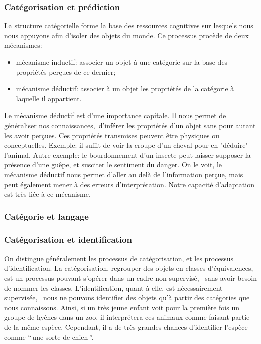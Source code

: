 \subsubsection{Catégorisation et prédiction}
\label{sec:ch3_categoPred}

La structure catégorielle forme la base des ressources cognitives sur lesquels nous nous appuyons afin d'isoler des objets du monde. Ce processus procède de deux mécanismes:

\begin{itemize} 
\item mécanisme inductif: associer un objet à une catégorie sur la base des propriétés perçues de ce dernier;
\item mécanisme déductif: associer à un objet les propriétés de la catégorie à laquelle il appartient.
\end{itemize}

Le mécanisme déductif est d'une importance capitale. Il nous permet de généraliser nos connaissances,\ie~d'inférer les propriétés d'un objet sans pour autant les avoir perçues. Ces propriétés transmises peuvent être physiques ou conceptuelles. Exemple: il suffit de voir la croupe d'un cheval pour en "déduire" l'animal. Autre exemple: le bourdonnement d'un insecte peut laisser supposer la présence d'une guêpe, et susciter le sentiment du danger. On le voit, le mécanisme déductif nous permet d'aller au delà de l'information perçue, mais peut également mener à des erreurs d'interprétation. Notre capacité d’adaptation est très liée à ce mécanisme.

\subsubsection{Catégorie et langage}
\label{sec:ch3_catLang}

\subsubsection{Catégorisation et identification}

On distingue généralement les processus de catégorisation, et les processus d'identification.  La catégorisation, \ie regrouper des objets en classes d'équivalences, est un processus pouvant s'opérer dans un cadre non-supervisé, \ie~sans avoir besoin de nommer les classes. L'identification, quant à elle, est nécessairement supervisée, \ie~nous ne pouvons identifier des objets qu'à partir des catégories que nous connaissons. Ainsi, si un très jeune enfant voit pour la première fois un groupe de hyènes dans un zoo, il interprétera ces animaux comme faisant partie de la même espèce. Cependant, il a de très grandes chances d’identifier l'espèce comme ``\,une sorte de chien\,''.


